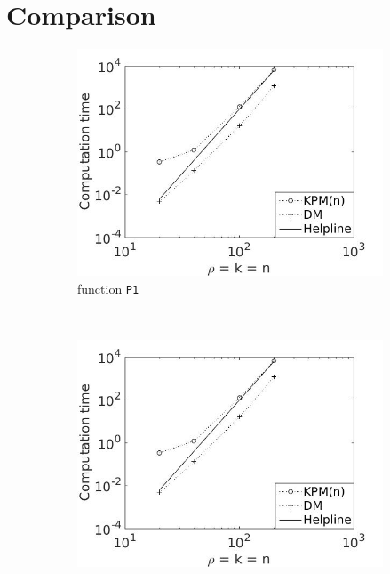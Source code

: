 \section{Comparison}
\begin{figure}[H]
        \centering
        \begin{subfigure}[b]{0.45\textwidth}
                \includegraphics[width=\textwidth]{fig/comp2}
                \caption{function \texttt{P1}}
                \label{fig:c1comp1m}
        \end{subfigure}%
        ~
        \begin{subfigure}[b]{0.45\textwidth}
                \includegraphics[width=\textwidth]{fig/comp2}

\end{subfigure}
\end{figure}
